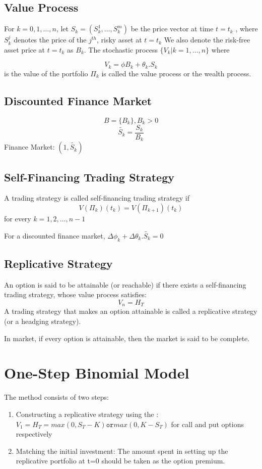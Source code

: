 \documentclass{report}
\begin{document}
\subsection{Value Process}
For $k = 0, 1, \dots, n$, let $S_k = (S_k^1, \dots, S_k^m)$ be the price vector at time $t = t_k$ , where $S_k^j$ denotes the price of the $j^{th}$, risky asset at $t=t_k$ We also denote the risk-free asset price at $t = t_k$ as $B_k$. The stochastic process $\{V_k | k = 1, \dots, n\}$ where

\begin{equation}
    V_k = \phi B_k + \theta_k.S_k
\end{equation}
is the value of the portfolio $\Pi_k$ is called the value process or the wealth process.

\subsection{Discounted Finance Market}
\[B = \{B_k\}, B_k > 0\]
\[\tilde{S_k} = \frac{S_k}{B_k}\]
Finance Market: $(1, \tilde{S_k})$


\subsection{Self-Financing Trading Strategy}
A trading strategy is called self-financing trading strategy if 
\[V(\Pi_k)(t_k) = V(\Pi_{k+1})(t_k)\]
for every $k = 1, 2, \dots, n-1$


For a discounted finance market, 
$\Delta \phi_k + \Delta \theta_k . \tilde{S_k} = 0$


\subsection{Replicative Strategy}
An option is said to be attainable (or reachable) if there exists a self-financing trading strategy, whose value process satisfies:
\[V_n = H_T\]
A trading strategy that makes an option attainable is called a replicative strategy (or a headging strategy).


In market, if every option is attainable, then the market is said to be complete.



\section{One-Step Binomial Model}
The method consists of two steps: 
\begin{enumerate}
    \item Constructing a replicative strategy using the :
    $V_1 = H_T = max(0, S_T-K) \texttt{or} max(0, K-S_T)$ for call and put options respectively
    \item Matching the initial investment: The amount spent in setting up the replicative portfolio at t=0 should be taken as the option premium.
\end{enumerate}
\end{document}
